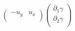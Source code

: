 \documentclass{homework}
\begin{document}
\begin{solution}
\[\begin{pmatrix}
                                                                                                                                                                                          -u_y & u_x\\
                                                                                                                                                                                          \end{pmatrix}
                                                                                                                                                                                          \begin{pmatrix}
                                                                                                                                                                                          \partial_1\gamma\\
                                                                                                                                                                                          \partial_2\gamma\\
                                                                                                                                                                                          \end{pmatrix}\]


\end{solution}
\end{document}
